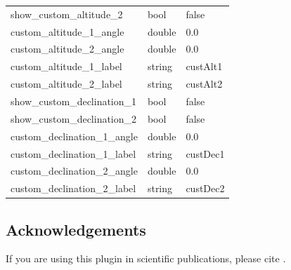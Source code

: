 \begin{longtable}{l|l|l}
show\_custom\_altitude\_2      &bool        & false    \\
custom\_altitude\_1\_angle     &double      & 0.0      \\
custom\_altitude\_2\_angle     &double      & 0.0      \\
custom\_altitude\_1\_label     &string      & custAlt1 \\
custom\_altitude\_2\_label     &string      & custAlt2 \\\midrule
show\_custom\_declination\_1   &bool        & false    \\
show\_custom\_declination\_2   &bool        & false    \\
custom\_declination\_1\_angle  &double      & 0.0      \\
custom\_declination\_1\_label  &string      & custDec1 \\
custom\_declination\_2\_angle  &double      & 0.0      \\
custom\_declination\_2\_label  &string      & custDec2 \\\bottomrule
\end{longtable}

\subsection{Acknowledgements}

If you are using this plugin in scientific publications, please cite \citet{Zotti:SEAC2015}.



